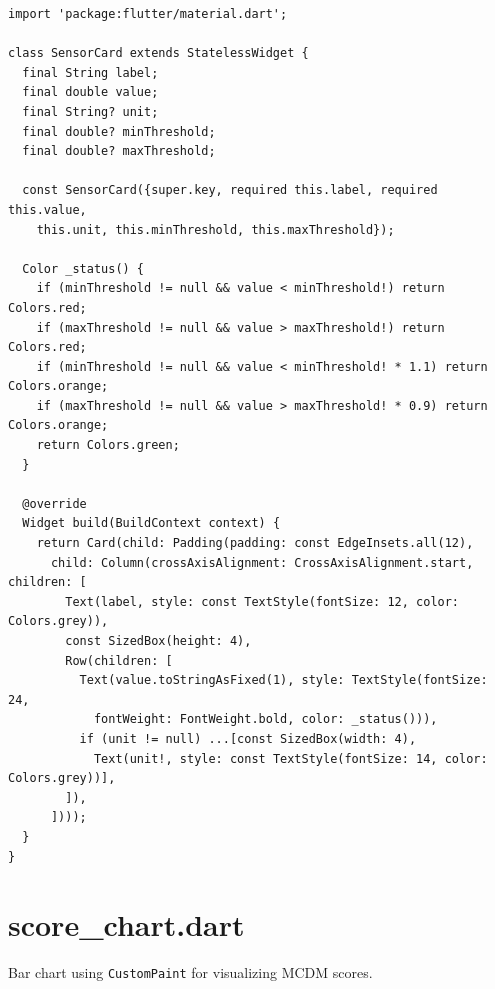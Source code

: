 \documentclass[12pt,a4paper,oneside]{report}
\newcommand{\code}[1]{\texttt{#1}}
\begin{document}
\begin{lstlisting}[style=dartstyle]
import 'package:flutter/material.dart';

class SensorCard extends StatelessWidget {
  final String label;
  final double value;
  final String? unit;
  final double? minThreshold;
  final double? maxThreshold;

  const SensorCard({super.key, required this.label, required this.value,
    this.unit, this.minThreshold, this.maxThreshold});

  Color _status() {
    if (minThreshold != null && value < minThreshold!) return Colors.red;
    if (maxThreshold != null && value > maxThreshold!) return Colors.red;
    if (minThreshold != null && value < minThreshold! * 1.1) return Colors.orange;
    if (maxThreshold != null && value > maxThreshold! * 0.9) return Colors.orange;
    return Colors.green;
  }

  @override
  Widget build(BuildContext context) {
    return Card(child: Padding(padding: const EdgeInsets.all(12),
      child: Column(crossAxisAlignment: CrossAxisAlignment.start, children: [
        Text(label, style: const TextStyle(fontSize: 12, color: Colors.grey)),
        const SizedBox(height: 4),
        Row(children: [
          Text(value.toStringAsFixed(1), style: TextStyle(fontSize: 24,
            fontWeight: FontWeight.bold, color: _status())),
          if (unit != null) ...[const SizedBox(width: 4),
            Text(unit!, style: const TextStyle(fontSize: 14, color: Colors.grey))],
        ]),
      ])));
  }
}
\end{lstlisting}

\section{score\_chart.dart}

Bar chart using \code{CustomPaint} for visualizing MCDM scores.
\end{document}
